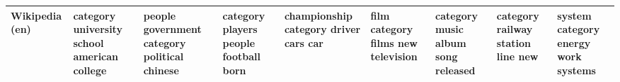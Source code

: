 \documentclass[11pt,a4paper]{article}
\begin{document}
\begin{appendices}
\begin{table}[htp]
\begin{tiny}
\begin{tabular}{|p{}|p{}|p{}|p{}|p{}|p{}|p{}|p{}|p{}|}
Wikipedia (en) & category \newline university \newline school \newline american \newline college & people \newline government \newline category \newline political \newline chinese & category \newline players \newline people \newline football \newline born & championship \newline category \newline driver \newline cars \newline car & film \newline category \newline films \newline new \newline television & category \newline music \newline album \newline song \newline released & category \newline railway \newline station \newline line \newline new & system \newline category \newline energy \newline work \newline systems\\\hline

\end{tabular}
\end{tiny}
\end{table}
\end{appendices}
\end{document}
